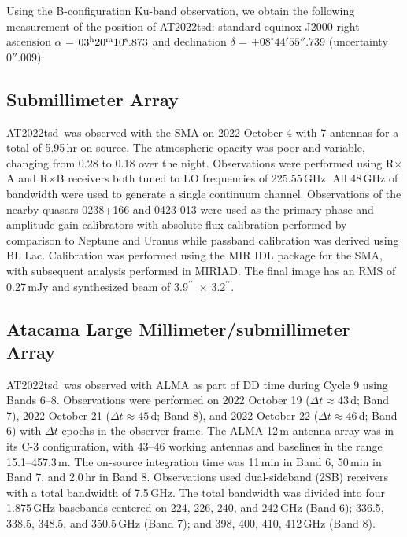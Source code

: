\documentclass{nature_plusfigure}
\newcommand{\at}{AT2022tsd}
\newcommand{\arcsec}{$^{\prime\prime}$}
\begin{document}
\begin{methods}
Using the B-configuration Ku-band observation, we obtain the following measurement of the position of \at:
standard equinox J2000 right ascension $\alpha$ =
$03^{\rm{h}}20^{\rm{m}}10^{\rm{s}}.873$
and declination $\delta$ = $+08^{\circ} 44' 55''.739$ 
(uncertainty $0''.009$).

\subsection{Submillimeter Array}
\label{Methods:SMA}

\at\ was observed with the SMA on 2022 October 4 with 7 antennas for a total of 5.95\,hr on source. The atmospheric opacity was poor and variable, changing from 0.28 to 0.18 over the night. Observations were performed using R$\times$A and R$\times$B receivers both tuned to LO frequencies of 225.55\,GHz. All 48\,GHz of bandwidth were used to generate a single continuum channel. Observations of the nearby quasars 0238+166 and 0423-013 were used as the primary phase and amplitude gain calibrators with absolute flux calibration performed by comparison to Neptune and Uranus while passband calibration was derived using BL Lac. Calibration was performed using the MIR IDL package for the SMA, with subsequent analysis performed in MIRIAD. The final image has an RMS of 0.27\,mJy and synthesized beam of 3.9\arcsec\ $\times$ 3.2\arcsec.

\subsection{Atacama Large Millimeter/submillimeter Array}
\label{sec:ALMA}

\at\ was observed with ALMA as part of DD time during Cycle 9 using Bands 6--8. Observations were performed on 2022 October 19 ($\Delta t \approx 43$\,d; Band 7), 2022 October 21 ($\Delta t \approx 45$\,d; Band 8), and 2022 October 22 ($\Delta t \approx 46$\,d; Band 6) with $\Delta t$ epochs in the observer frame. The ALMA 12\,m antenna array was in its C-3 configuration, with
43--46 working antennas and baselines in the range 15.1--457.3\,m. The on-source integration time was
11\,min in Band 6, 50\,min in Band 7, and 2.0\,hr in Band 8.
Observations used dual-sideband (2SB) receivers with a total bandwidth of 7.5\,GHz. The total bandwidth was divided into four 1.875\,GHz basebands centered on 224, 226, 240, and 242\,GHz (Band 6);
336.5, 338.5, 348.5, and 350.5\,GHz (Band 7);
and 398, 400, 410, 412\,GHz (Band 8).



\end{methods}
\end{document}
